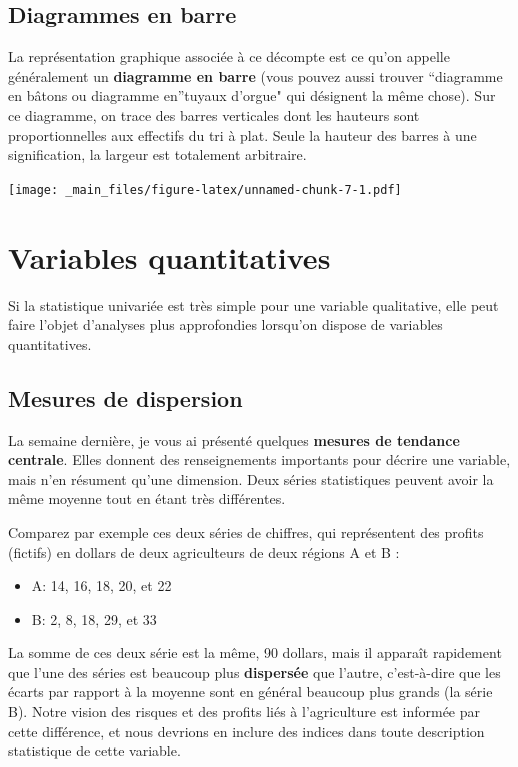 \documentclass[
]{book}
\providecommand{\tightlist}{%
  \setlength{\itemsep}{0pt}\setlength{\parskip}{0pt}}
\begin{document}
\hypertarget{diagrammes-en-barre}{%
\subsection{Diagrammes en barre}\label{diagrammes-en-barre}}

La représentation graphique associée à ce décompte est ce qu'on appelle généralement un \textbf{diagramme en barre} (vous pouvez aussi trouver ``diagramme en bâtons ou diagramme en''tuyaux d'orgue" qui désignent la même chose). Sur ce diagramme, on trace des barres verticales dont les hauteurs sont proportionnelles aux effectifs du tri à plat. Seule la hauteur des barres à une signification, la largeur est totalement arbitraire.

\texttt{[image: \_main\_files/figure-latex/unnamed-chunk-7-1.pdf]}

\hypertarget{variables-quantitatives-1}{%
\section{Variables quantitatives}\label{variables-quantitatives-1}}

Si la statistique univariée est très simple pour une variable qualitative, elle peut faire l'objet d'analyses plus approfondies lorsqu'on dispose de variables quantitatives.

\hypertarget{mesures-de-dispersion}{%
\subsection{Mesures de dispersion}\label{mesures-de-dispersion}}

La semaine dernière, je vous ai présenté quelques \textbf{mesures de tendance centrale}. Elles donnent des renseignements importants pour décrire une variable, mais n'en résument qu'une dimension. Deux séries statistiques peuvent avoir la même moyenne tout en étant très différentes.

Comparez par exemple ces deux séries de chiffres, qui représentent des profits (fictifs) en dollars de deux agriculteurs de deux régions A et B :

\begin{itemize}
\tightlist
\item
  A: 14, 16, 18, 20, et 22
\item
  B: 2, 8, 18, 29, et 33
\end{itemize}

La somme de ces deux série est la même, 90 dollars, mais il apparaît rapidement que l'une des séries est beaucoup plus \textbf{dispersée} que l'autre, c'est-à-dire que les écarts par rapport à la moyenne sont en général beaucoup plus grands (la série B). Notre vision des risques et des profits liés à l'agriculture est informée par cette différence, et nous devrions en inclure des indices dans toute description statistique de cette variable.
\end{document}
